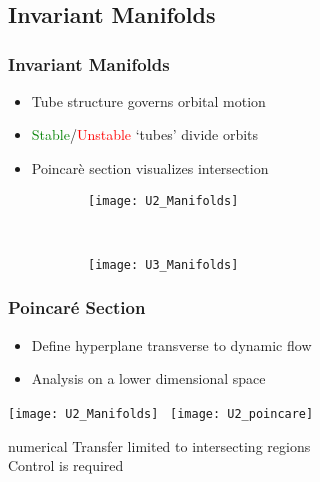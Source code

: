 \section*{}
\subsection*{Invariant Manifolds}

\begin{frame}%
\frametitle{Invariant Manifolds}
\begin{itemize}
	\item Tube structure governs orbital motion
	\item \textcolor{green}{Stable}/\textcolor{red}{Unstable} `tubes' divide orbits
	\item Poincar\`e section visualizes intersection
\end{itemize}
 \begin{figure}
     \centering
        \begin{subfigure}[b]{0.5\textwidth}
                \texttt{[image: U2\_Manifolds]}
        \end{subfigure}%
        ~%
        \begin{subfigure}[b]{0.5\textwidth}
                \texttt{[image: U3\_Manifolds]}
        \end{subfigure}
\end{figure}
\end{frame}%

\begin{frame}[t]%
\frametitle{Poincar\'e Section}
	\begin{itemize}
		\item Define hyperplane transverse to dynamic flow
		\item Analysis on a lower dimensional space
	\end{itemize}

    \texttt{[image: U2\_Manifolds]}~
    \texttt{[image: U2\_poincare]}

	\pause
	\begin{beamercolorbox}[sep=0.2cm,center]{numerical}
		Transfer limited to intersecting regions \\
		Control is required 
	\end{beamercolorbox}
\end{frame}%

